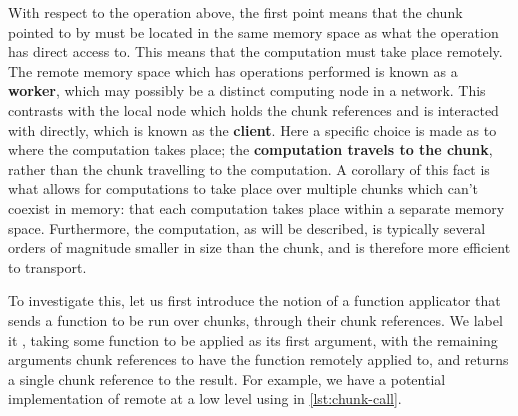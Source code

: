 With respect to the  operation above, the first point means
that the chunk pointed to by  must be located in the same
memory space as what the  operation has direct access to.
This means that the computation must take place remotely. The remote
memory space which has operations performed is known as a
\textbf{worker}, which may possibly be a distinct computing node in a
network. This contrasts with the local node which holds the chunk
references and is interacted with directly, which is known as the
\textbf{client}. Here a specific choice is made as to where the
computation takes place; the \textbf{computation travels to the chunk},
rather than the chunk travelling to the computation. A corollary of this
fact is what allows for computations to take place over multiple chunks
which can't coexist in memory: that each computation takes place within
a separate memory space. Furthermore, the computation, as will be
described, is typically several orders of magnitude smaller in size than
the chunk, and is therefore more efficient to transport.

To investigate this, let us first introduce the notion of a function
applicator that sends a function to be run over chunks, through their
chunk references. We label it , taking some function
to be applied as its first argument, with the remaining arguments chunk
references to have the function remotely applied to, and returns a
single chunk reference to the result. For example, we have a potential
implementation of remote  at a low level using
 in \cref{lst:chunk-call}.


